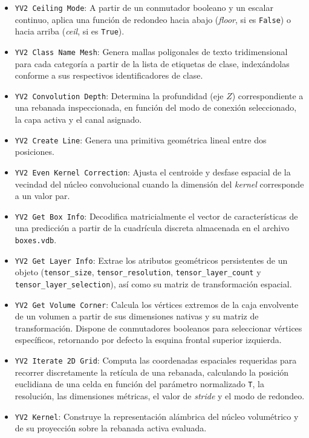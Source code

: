 \begin{itemize}
    \item \texttt{YV2 Ceiling Mode}: A partir de un conmutador booleano y un escalar continuo, aplica una función de redondeo hacia abajo 
    (\textit{floor}, si es \texttt{False}) o hacia arriba (\textit{ceil}, si es \texttt{True}).
    \item \texttt{YV2 Class Name Mesh}: Genera mallas poligonales de texto tridimensional para cada categoría a partir de la lista de 
    etiquetas de clase, indexándolas conforme a sus respectivos identificadores de clase.
    \item \texttt{YV2 Convolution Depth}: Determina la profundidad (eje $Z$) correspondiente a una rebanada inspeccionada, en función 
    del modo de conexión seleccionado, la capa activa y el canal asignado.
    \item \texttt{YV2 Create Line}: Genera una primitiva geométrica lineal entre dos posiciones.
    \item \texttt{YV2 Even Kernel Correction}: Ajusta el centroide y desfase espacial de la vecindad del núcleo convolucional cuando la 
    dimensión del \textit{kernel} corresponde a un valor par.
    \item \texttt{YV2 Get Box Info}: Decodifica matricialmente el vector de características de una predicción a partir de la cuadrícula 
    discreta almacenada en el archivo \texttt{boxes.vdb}.
    \item \texttt{YV2 Get Layer Info}: Extrae los atributos geométricos persistentes de un objeto (\texttt{tensor\_size}, 
    \texttt{tensor\_resolution}, \texttt{tensor\_layer\_count} y \texttt{tensor\_layer\_selection}), 
    así como su matriz de transformación espacial.
    \item \texttt{YV2 Get Volume Corner}: Calcula los vértices extremos de la caja envolvente de un volumen a partir de sus dimensiones 
    nativas y su matriz de transformación. Dispone de conmutadores booleanos para seleccionar vértices específicos, retornando por defecto 
    la esquina frontal superior izquierda.
    \item \texttt{YV2 Iterate 2D Grid}: Computa las coordenadas espaciales requeridas para recorrer discretamente la retícula de una rebanada, 
    calculando la posición euclidiana de una celda en función del parámetro normalizado \texttt{T}, la resolución, las dimensiones métricas, 
    el valor de \textit{stride} y el modo de redondeo.
    \item \texttt{YV2 Kernel}: Construye la representación alámbrica del núcleo volumétrico y de su proyección sobre la rebanada activa evaluada.

\end{itemize}
